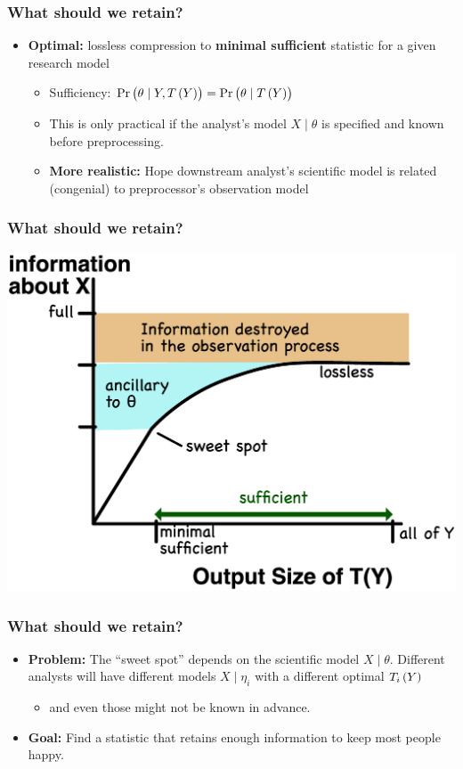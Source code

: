 \documentclass[10pt, compress]{beamer}
\begin{document}
\begin{frame}[fragile]
    \frametitle{What should we retain?}
    \begin{itemize}
        \item \textbf{Optimal:} lossless compression to \textbf{minimal sufficient} statistic for a given research model
            \begin{itemize}
                \item Sufficiency: $\Pr\del{\theta \mid Y,T\del{Y}}=\Pr\del{\theta \mid T\del{Y}}$
                \item This is only practical if the analyst's model $X \mid \theta$ is specified and known before preprocessing.
                \item \textbf{More realistic:} Hope downstream analyst's scientific model is related (congenial) to preprocessor's observation model
            \end{itemize}
    \end{itemize}
\end{frame}

\begin{frame}[fragile]
    \frametitle{What should we retain?}
    \includegraphics[width=\textwidth]{assets/information.eps}
\end{frame}

\begin{frame}[fragile]
    \frametitle{What should we retain?}
    \begin{itemize}
        \item \textbf{Problem:} The “sweet spot” depends on the scientific model $X \mid \theta$. Different analysts will have different models $X \mid \eta_i$ with a different optimal $T_i\del{Y}$
            \begin{itemize}
                \item and even those might not be known in advance.
            \end{itemize}
        \item \textbf{Goal:} Find a statistic that retains enough information to keep most people happy.
    \end{itemize}
\end{frame}
\end{document}
